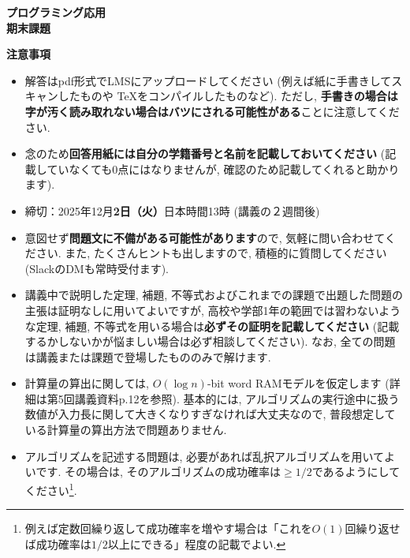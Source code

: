 \documentclass[12pt,a4paper]{article}
\begin{document}
\begin{center}
    {\Large \textbf{プログラミング応用}}\\[0.5em]
    {\large \textbf{期末課題}}\\[1em]
\end{center}

\noindent\textbf{注意事項}

\begin{itemize}[leftmargin=1em]
    \item 解答はpdf形式でLMSにアップロードしてください (例えば紙に手書きしてスキャンしたものや \TeX をコンパイルしたものなど). ただし, \textbf{手書きの場合は字が汚く読み取れない場合はバツにされる可能性がある}ことに注意してください.
    \item 念のため\textbf{回答用紙には自分の学籍番号と名前を記載しておいてください} (記載していなくても0点にはなりませんが, 確認のため記載してくれると助かります).
    \item 締切：2025年12月\textbf{2日（火）}日本時間13時 (講義の２週間後)
    \item 意図せず\textbf{問題文に不備がある可能性があります}ので, 気軽に問い合わせてください. また, たくさんヒントも出しますので, 積極的に質問してください (SlackのDMも常時受付ます).
    \item 講義中で説明した定理, 補題, 不等式およびこれまでの課題で出題した問題の主張は証明なしに用いてよいですが, 高校や学部1年の範囲では習わないような定理, 補題, 不等式を用いる場合は\textbf{必ずその証明を記載してください} (記載するかしないかが悩ましい場合は必ず相談してください). なお, 全ての問題は講義または課題で登場したもののみで解けます.
    \item 計算量の算出に関しては, $O(\log n)$-bit word RAMモデルを仮定します (詳細は第5回講義資料p.12を参照). 基本的には, アルゴリズムの実行途中に扱う数値が入力長に関して大きくなりすぎなければ大丈夫なので, 普段想定している計算量の算出方法で問題ありません.
    \item アルゴリズムを記述する問題は, 必要があれば乱択アルゴリズムを用いてよいです. その場合は, そのアルゴリズムの成功確率は$\ge 1/2$であるようにしてください\footnote{例えば定数回繰り返して成功確率を増やす場合は「これを$O(1)$回繰り返せば成功確率は$1/2$以上にできる」程度の記載でよい.}.
\end{itemize}
\end{document}
